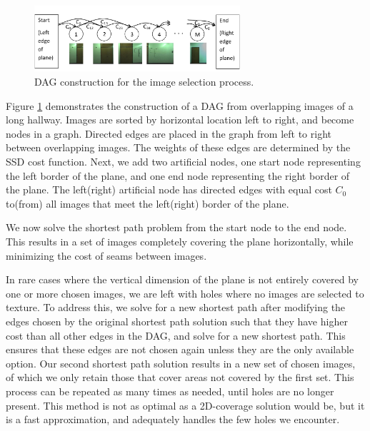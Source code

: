 \message{ !name(oldpaper.tex)}\documentclass[10pt,twocolumn,letterpaper]{article}
\begin{document}
\begin{figure}
  \centering
  \includegraphics[width=3in]{dagCreation.pdf}
  \caption{DAG construction for the image selection process. \\}
  \label{fig:dagCreation}
\end{figure}

Figure \ref{fig:dagCreation} demonstrates the construction of a DAG
from overlapping images of a long hallway. Images are sorted by
horizontal location left to right, and become nodes in a
graph. Directed edges are placed in the graph from left to right
between overlapping images. The weights of these edges are determined
by the SSD cost function. Next, we add two artificial nodes, one start
node representing the left border of the plane, and one end node
representing the right border of the plane. The left(right) artificial
node has directed edges with equal cost $C_0$ to(from) all images that
meet the left(right) border of the plane.

We now solve the shortest path problem from the start node to the end
node. This results in a set of images completely covering the plane
horizontally, while minimizing the cost of seams between images.

In rare cases where the vertical dimension of the plane is not
entirely covered by one or more chosen images, we are left with holes
where no images are selected to texture. To address this, we solve for
a new shortest path after modifying the edges chosen by the original
shortest path solution such that they have higher cost than all other
edges in the DAG, and solve for a new shortest path. This ensures that
these edges are not chosen again unless they are the only available
option. Our second shortest path solution results in a new set of
chosen images, of which we only retain those that cover areas not
covered by the first set. This process can be repeated as many times
as needed, until holes are no longer present. This method is not as
optimal as a 2D-coverage solution would be, but it is a fast
approximation, and adequately handles the few holes we encounter.
\end{document}
